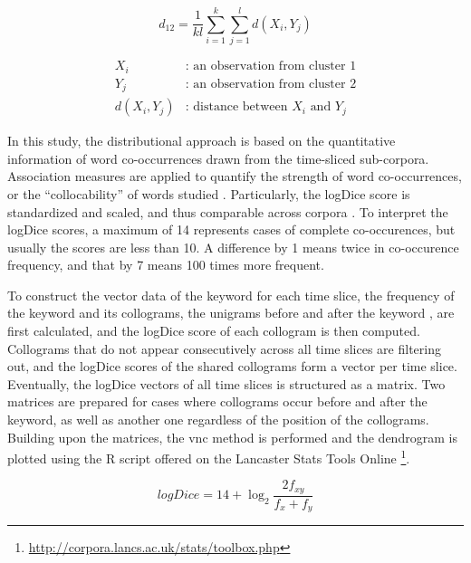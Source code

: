 \begin{equation}
  d_{12} = \frac{1}{kl}\displaystyle\sum\limits_{i=1}^k {\displaystyle\sum\limits_{j=1}^l d(X_i, Y_j)}
\end{equation}

\begin{equation*}
  \begin{aligned}
    X_i &\text{: an observation from cluster 1} \\
    Y_j &\text{: an observation from cluster 2} \\
    d(X_i, Y_j) &\text{: distance between } X_i \text{ and } Y_j
  \end{aligned}
\end{equation*}

In this study, the distributional approach is based on the quantitative information of word co-occurrences drawn from the time-sliced sub-corpora. Association measures are applied to quantify the strength of word co-occurrences, or the ``collocability'' of words studied \parencite{gablasova2017collocations}. Particularly, the logDice score is standardized and scaled, and thus comparable across corpora \parencite{rychly2008lexicographer,gablasova2017collocations}. To interpret the logDice scores, a maximum of 14 represents cases of complete co-occurences, but usually the scores are less than 10. A difference by 1 means twice in co-occurence frequency, and that by 7 means 100 times more frequent.

To construct the vector data of the keyword \jia for each time slice, the frequency of the keyword and its collograms, the unigrams before and after the keyword \parencite{gablasova2017collocations}, are first calculated, and the logDice score of each collogram is then computed. Collograms that do not appear consecutively across all time slices are filtering out, and the logDice scores of the shared collograms form a vector per time slice. Eventually, the logDice vectors of all time slices is structured as a matrix. Two matrices are prepared for cases where collograms occur before and after the keyword, as well as another one regardless of the position of the collograms. Building upon the matrices, the \gls{vnc} method is performed and the dendrogram is plotted using the R script offered on the Lancaster Stats Tools Online \parencite{brezina2018statistics}\footnote{\url{http://corpora.lancs.ac.uk/stats/toolbox.php}}.

\begin{equation}
  logDice = 14 + \log_{2}{\frac{2f_{xy}}{f_x + f_y}}
\end{equation}


